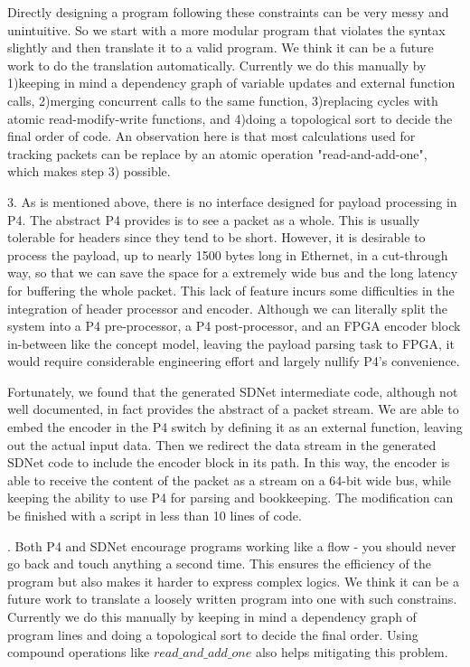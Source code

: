 Directly designing a program following these constraints can be very messy
and unintuitive. So we start with a more modular program that violates the
syntax slightly and then translate it to a valid program. We think it can be 
a future work to do the translation automatically. Currently we do this manually
by 1)keeping in mind a dependency graph of variable updates and external function 
calls, 2)merging concurrent calls to the same function, 3)replacing cycles with
atomic read-modify-write functions, and 4)doing a topological sort to decide 
the final order of code. An observation here is that most calculations used
for tracking packets can be replace by an atomic operation "read-and-add-one",
which makes step 3) possible.

3. As is mentioned above, there is no interface designed for payload processing
in P4. The abstract P4 provides is to see a packet as a whole. This is usually 
tolerable for headers since they tend to be short. However, it is desirable to process
the payload, up to nearly 1500 bytes long in Ethernet, in a cut-through way, so that we can 
save the space for a extremely wide bus and the long latency for buffering the 
whole packet. This lack of feature incurs some difficulties in the integration of header processor and encoder.
Although we can literally split the system into a P4 pre-processor, a P4 post-processor, 
and an FPGA encoder block in-between like the concept model, leaving the payload parsing task to FPGA,
it would require considerable engineering effort and largely nullify P4's convenience.

Fortunately, we found that the generated SDNet intermediate code, although not well documented,
in fact provides the abstract of a packet stream. We are able to embed the encoder in the P4 switch by
defining it as an external function, leaving out the actual input data. Then we 
redirect the data stream in the generated SDNet code to include the encoder block in
its path. In this way, the encoder is able to receive the content of the packet as a stream
on a 64-bit wide bus, while keeping the ability to use P4 for parsing and bookkeeping.
The modification can be finished with a script in less than 10 lines of code.


. Both P4 and SDNet encourage programs working like a flow - you should never go back and touch anything
a second time. This ensures the efficiency of the program but also makes it harder to express complex
logics. We think it can be a future work to translate a loosely written program into one with such constrains.
Currently we do this manually by keeping in mind a dependency graph of program lines and doing a topological sort
to decide the final order. Using compound operations like
$read\_and\_add\_one$ also helps mitigating this problem.

